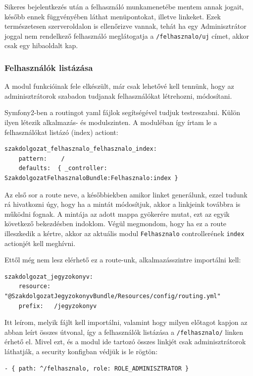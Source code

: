 \documentclass[a4paper,12pt,oneside]{report}
\begin{document}
Sikeres bejelentkezés után a felhasználó munkamenetébe mentem annak jogait, később ennek függvényében láthat menüpontokat, illetve linkeket. Ezek természetesen szerveroldalon is ellenőrizve vannak, tehát ha egy Adminisztrátor joggal nem rendelkező felhasználó meglátogatja a {\tt /felhasznalo/uj} címet, akkor csak egy hibaoldalt kap.

\subsubsection*{Felhasználók listázása}

A modul funkcióinak fele elkészült, már csak lehetővé kell tennünk, hogy az adminisztrátorok szabadon tudjanak felhasználókat létrehozni, módosítani.

Symfony2-ben a routingot yaml fájlok segítségével tudjuk testreszabni. Külön ilyen létezik alkalmazás- és modulszinten. A moduléban így írtam le a felhasználókat listázó (index) actiont:

\begin{lstlisting}
szakdolgozat_felhasznalo_felhasznalo_index:
    pattern:    /
    defaults:  { _controller: SzakdolgozatFelhasznaloBundle:Felhasznalo:index }
\end{lstlisting}

Az első sor a route neve, a későbbiekben amikor linket generálunk, ezzel tudunk rá hivatkozni úgy, hogy ha a mintát módosítjuk, akkor a linkjeink továbbra is működni fognak. A mintája az adott mappa gyökerére mutat, ezt az egyik következő bekezdésben indoklom. Végül megmondom, hogy ha ez a route illeszkedik a kértre, akkor az aktuális modul {\tt Felhasznalo} controllerének {\tt index} actionjét kell meghívni.

Ettől még nem lesz elérhető ez a route-unk, alkalmazásszintre importálni kell:

\begin{lstlisting}
szakdolgozat_jegyzokonyv:
    resource: "@SzakdolgozatJegyzokonyvBundle/Resources/config/routing.yml"
    prefix:   /jegyzokonyv
\end{lstlisting}

Itt leírom, melyik fájlt kell importálni, valamint hogy milyen előtagot kapjon az abban leírt összes útvonal, így a felhasználók listázása a {\tt /felhasznalo/} linken érhető el. Mivel ezt, és a modul ide tartozó összes linkjét csak adminisztrátorok láthatják, a security konfigban védjük is le rögtön:

\begin{lstlisting}
- { path: ^/felhasznalo, role: ROLE_ADMINISZTRATOR }
\end{lstlisting}
\end{document}
